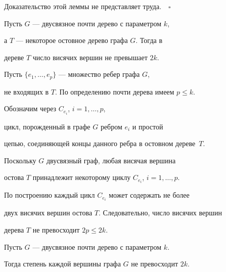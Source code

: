 Доказательство этой леммы не представляет труда.$\quad\square$





\begin{lems} \label{BoundLeaf}


Пусть $G$ --- двусвязное почти дерево с параметром $k$,


а $T$ --- некоторое остовное дерево графа $G$. Тогда в


дереве $T$ число висячих вершин не превышает $2k$.


\end{lems}





\begin{pf}


Пусть $\{e_1,\dotsc, e_p\}$ --- множество ребер графа $G$,


не входящих в $T$. По определению почти дерева имеем $p\le k$.


Обозначим через $C_{e_i}$, $i=1,\dotsc, p$, 


цикл, порожденный в графе $G$ ребром $e_i$ и простой


цепью, соединяющей концы данного ребра в остовном дереве~$T$.


Поскольку $G$ двусвязный граф, любая висячая вершина


остова $T$ принадлежит некоторому циклу $C_{e_i}$, $i=1,\dotsc, p$.


По построению каждый цикл $C_{e_i}$ может содержать не более


двух висячих вершин остова $T$. Следовательно, число висячих вершин


дерева $T$ не превосходит $2p\le 2k$.


\end{pf}





\begin{lems}


Пусть $G$ --- двусвязное почти дерево с параметром $k$.


Тогда степень каждой вершины графа $G$ не превосходит $2k$.


\label{mainlem}


\end{lems}





